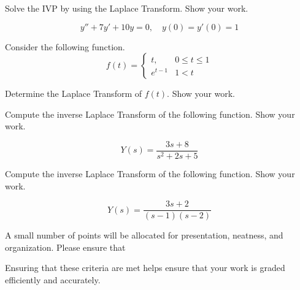 \documentclass[12pt]{exam}
\begin{document}
    


\newpage

\begin{questions}

\question[7] Solve the IVP by using the Laplace Transform. Show your work. 

$$y''+7y'+10y = 0, \quad y(0) = y'(0) = 1$$

\newpage 

\question[4] Consider the following function. $$f(t) = \begin{cases}  t,&0\leq t\leq 1 \\ e^{t-1} & 1 < t  \end{cases}$$

Determine the Laplace Transform of $f(t)$. Show your work. 

\newpage 

\question[4] Compute the inverse Laplace Transform of the following function. Show your work. 

$$ Y(s) = \frac{3s+8}{s^2+2s+5}$$
    
\newpage

\question[4] 

Compute the inverse Laplace Transform of the following function. Show your work. 

$$Y(s)  = \frac{3s+2}{(s-1)(s-2)}$$




\newpage



\question[1] A small number of points will be allocated for presentation, neatness, and organization. Please ensure that
    Ensuring that these criteria are met helps ensure that your work is graded efficiently and accurately. 

\end{questions}
\vspace{2cm}
    
\end{document}
